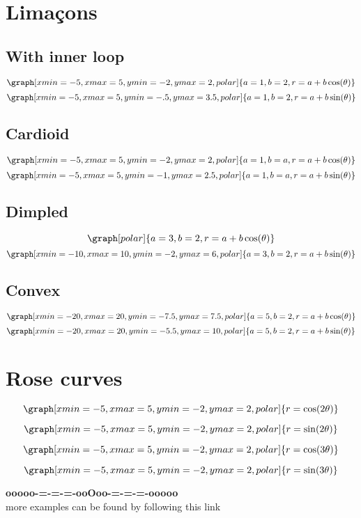 \documentclass{ximera}
\begin{document}
\section*{Lima\c{c}ons}

\subsection*{With inner loop}
\[
\graph[xmin=-5,xmax=5,ymin=-2,ymax=2,polar]{a=1,b=2,r=a+b \cos(\theta)}
\]
\[
\graph[xmin=-5,xmax=5,ymin=-.5,ymax=3.5,polar]{a=1,b=2,r=a+b \sin(\theta)}
\]
\subsection*{Cardioid}
\[
\graph[xmin=-5,xmax=5,ymin=-2,ymax=2,polar]{a=1,b=a,r=a+b \cos(\theta)}
\]
\[
\graph[xmin=-5,xmax=5,ymin=-1,ymax=2.5,polar]{a=1,b=a,r=a+b \sin(\theta)}
\]
\subsection*{Dimpled}
\[
\graph[polar]{a=3,b=2,r=a+b \cos(\theta)}
\]
\[
\graph[xmin=-10,xmax=10,ymin=-2,ymax=6,polar]{a=3,b=2,r=a+b \sin(\theta)}
\]

\subsection*{Convex}
\[
\graph[xmin=-20,xmax=20,ymin=-7.5,ymax=7.5,polar]{a=5,b=2,r=a+b \cos(\theta)}
\]
\[
\graph[xmin=-20,xmax=20,ymin=-5.5,ymax=10,polar]{a=5,b=2,r=a+b \sin(\theta)}
\]

\section*{Rose curves}

\[
\graph[xmin=-5,xmax=5,ymin=-2,ymax=2,polar]{r=\cos(2\theta)}
\]

\[
\graph[xmin=-5,xmax=5,ymin=-2,ymax=2,polar]{r=\sin(2\theta)}
\]

\[
\graph[xmin=-5,xmax=5,ymin=-2,ymax=2,polar]{r=\cos(3\theta)}
\]

\[
\graph[xmin=-5,xmax=5,ymin=-2,ymax=2,polar]{r=\sin(3\theta)}
\]











\begin{center}
\textbf{\textcolor{green!50!black}{ooooo-=-=-=-ooOoo-=-=-=-ooooo}} \\

more examples can be found by following this link\\ 

\end{center}
\end{document}
